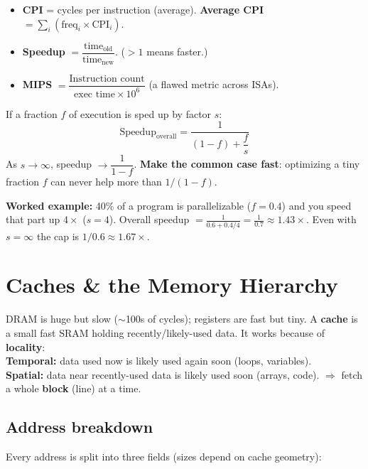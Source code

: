 \documentclass[10pt]{article}
\begin{document}
\begin{itemize}
\item \textbf{CPI} = cycles per instruction (average). \textbf{Average CPI} $=\sum_i (\text{freq}_i \times \text{CPI}_i)$.
\item \textbf{Speedup} $= \dfrac{\text{time}_{\text{old}}}{\text{time}_{\text{new}}}$. ($>1$ means faster.)
\item \textbf{MIPS} $= \dfrac{\text{Instruction count}}{\text{exec time}\times 10^6}$ (a flawed metric across ISAs).
\end{itemize}

\begin{formbox}
If a fraction $f$ of execution is sped up by factor $s$:
\[ \text{Speedup}_{\text{overall}} = \frac{1}{(1-f) + \dfrac{f}{s}} \]
As $s\to\infty$, speedup $\to \dfrac{1}{1-f}$. \textbf{Make the common case fast}: optimizing a
tiny fraction $f$ can never help more than $1/(1-f)$.
\end{formbox}

\textbf{Worked example:} 40\% of a program is parallelizable ($f{=}0.4$) and you speed that part
up $4\times$ ($s{=}4$). Overall speedup $= \frac{1}{0.6 + 0.4/4}=\frac{1}{0.7}\approx 1.43\times$.
Even with $s=\infty$ the cap is $1/0.6\approx1.67\times$.

\section{Caches \& the Memory Hierarchy}

\begin{keybox}
DRAM is huge but slow ($\sim$100s of cycles); registers are fast but tiny. A \textbf{cache} is a
small fast SRAM holding recently/likely-used data. It works because of \textbf{locality}:\\
\textbf{Temporal:} data used now is likely used again soon (loops, variables).\\
\textbf{Spatial:} data near recently-used data is likely used soon (arrays, code). $\Rightarrow$
fetch a whole \textbf{block} (line) at a time.
\end{keybox}

\subsection{Address breakdown}
Every address is split into three fields (sizes depend on cache geometry):
\begin{center}
\end{center}
\end{document}
